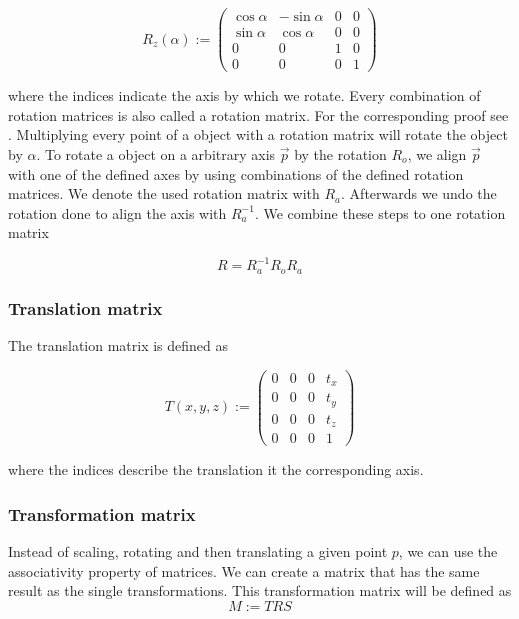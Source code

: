 \[
  R_z(\alpha) := \left(
                  \begin{array}{cccc}
                      \cos \alpha & -\sin \alpha & 0 & 0 \\
                      \sin \alpha & \cos \alpha  & 0 & 0 \\
                      0          & 0           & 1 & 0 \\
                      0          & 0           & 0 & 1
                   \end{array}
                  \right)
\]

where the indices indicate the axis by which we rotate. Every
combination of rotation matrices is also called a rotation matrix. For
the corresponding proof see \cite{kenn}. Multiplying every point of a
object with a rotation matrix will rotate the object by $\alpha$. To
rotate a object on a arbitrary axis $\vec{p}$ by the rotation $R_o$, we
align $\vec{p}$ with one of the defined axes by using combinations of
the defined rotation matrices. We denote the used rotation matrix with
$R_a$. Afterwards we undo the rotation done to align the axis with
$R_a^{-1}$. We combine these steps to one rotation matrix

\[
  R = R_a^{-1}R_oR_a
\]

\subsubsection{Translation matrix}\label{translation-matrix}

The translation matrix is defined as

\[
  T(x,y,z):= \left(
                \begin{array}{cccc}
                  0 & 0 & 0 & t_x \\
                  0 & 0 & 0 & t_y \\
                  0 & 0 & 0 & t_z \\
                  0 & 0 & 0 & 1
                \end{array}
              \right)
\]

where the indices describe the translation it the corresponding axis.

\subsubsection{Transformation matrix}\label{transformation-matrix}

Instead of scaling, rotating and then translating a given point $p$, we
can use the associativity property of matrices. We can create a matrix
that has the same result as the single transformations. This
transformation matrix will be defined as \[
  M := TRS
\]

